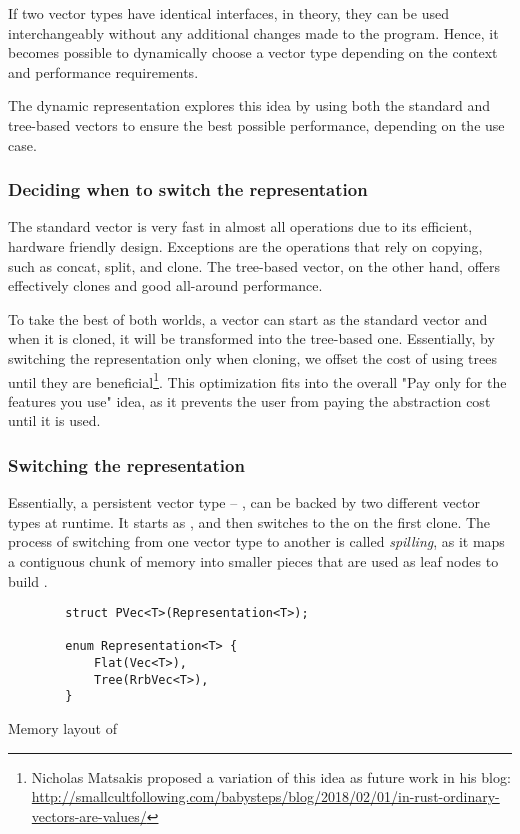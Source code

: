 If two vector types have identical interfaces, in theory, they can be used interchangeably without any additional changes made to the program. Hence, it becomes possible to dynamically choose a vector type depending on the context and performance requirements.

The dynamic representation explores this idea by using both the standard and tree-based vectors to ensure the best possible performance, depending on the use case.

\subsubsection*{Deciding when to switch the representation}
The standard vector is very fast in almost all operations due to its efficient, hardware friendly design. Exceptions are the operations that rely on copying, such as concat, split, and clone. The tree-based vector, on the other hand, offers effectively  clones and good all-around performance.

To take the best of both worlds, a vector can start as the standard vector and when it is cloned, it will be transformed into the tree-based one. Essentially, by switching the representation only when cloning, we offset the cost of using trees until they are beneficial\footnote{Nicholas Matsakis proposed a variation of this idea as future work in his blog: \url{http://smallcultfollowing.com/babysteps/blog/2018/02/01/in-rust-ordinary-vectors-are-values/}}. This optimization fits into the overall "Pay only for the features you use" idea, as it prevents the user from paying the abstraction cost until it is used.

\subsubsection*{Switching the representation}
Essentially, a persistent vector type -- \pvec{}, can be backed by two different vector types at runtime. It starts as \stdvec{}, and then switches to the \rrbvec{} on the first clone. The process of switching from one vector type to another is called \emph{spilling}, as it maps a contiguous chunk of memory into smaller pieces that are used as leaf nodes to build \rrbvec{}.

\begin{listing}[H]

    \centering
    \begin{verbatim}
        struct PVec<T>(Representation<T>);

        enum Representation<T> {
            Flat(Vec<T>),
            Tree(RrbVec<T>),
        }
    \end{verbatim}

    \caption{Memory layout of \pvec{}}
    \label{lst:pvec-memory-representation}
\end{listing}

